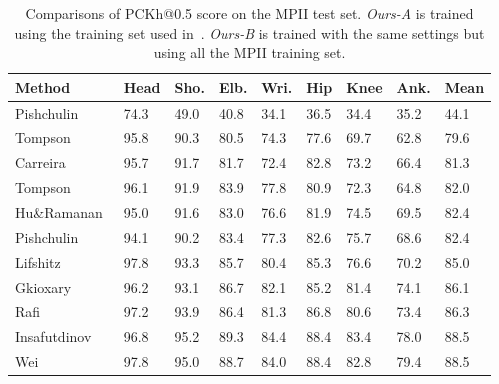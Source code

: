 \documentclass[10pt,twocolumn,letterpaper]{article}
\begin{document}
\begin{table}
	\begin{footnotesize}
		\centering
		\caption{ Comparisons of PCKh@0.5 score on the MPII test set. 
			\textit{Ours-A} is trained using the training set used in~\cite{tompson2015efficient}. 
			\textit{Ours-B} is trained with the same settings but using all the MPII training set.  
			}
		\begin{tabular} 
			{@{}p{2.6cm}p{0.3cm}p{0.3cm}p{0.3cm}p{0.3cm}p{0.3cm}p{0.3cm}p{0.3cm}p{0.5cm}}
			\hline
			Method & Head & Sho. & Elb. & Wri. & Hip & Knee & Ank. & Mean\\
			\hline
			Pishchulin \etal~\cite{pishchulin2013strong} & 74.3  & 49.0  & 40.8  & 34.1  & 36.5  & 34.4 & 35.2 & 44.1  \\
			Tompson \etal~\cite{tompson2014joint}& 95.8  & 90.3  & 80.5  & 74.3  & 77.6  & 69.7 & 62.8 & 79.6  \\
			Carreira \etal~\cite{carreira2016human} & 95.7  & 91.7  & 81.7  & 72.4  & 82.8  & 73.2 & 66.4 & 81.3  \\
			Tompson \etal~\cite{tompson2015efficient}& 96.1  & 91.9  & 83.9  & 77.8  & 80.9  & 72.3 & 64.8 & 82.0  \\
			Hu\&Ramanan~\cite{hu2016bottom} & 95.0  & 91.6  & 83.0  & 76.6  & 81.9  & 74.5 & 69.5 & 82.4  \\
			Pishchulin \etal~\cite{pishchulin2016deepcut} & 94.1  & 90.2  & 83.4  & 77.3  & 82.6  & 75.7 & 68.6 & 82.4   \\
			Lifshitz \etal~\cite{lifshitz2016human} & 97.8  & 93.3  & 85.7  & 80.4  & 85.3  & 76.6 & 70.2 & 85.0   \\
			Gkioxary \etal~\cite{gkioxari2016chained} & 96.2  & 93.1  & 86.7  & 82.1  & 85.2  & 81.4 & 74.1 & 86.1   \\
			Rafi \etal~\cite{rafi2016efficient} & 97.2  & 93.9  & 86.4  & 81.3  & 86.8  & 80.6 & 73.4 & 86.3   \\
			Insafutdinov \etal~\cite{insafutdinov2016deepercut} & 96.8  & 95.2  & 89.3  & 84.4  & 88.4  & 83.4 & 78.0 & 88.5   \\
			Wei \etal~\cite{wei2016convolutional} & 97.8  & 95.0  & 88.7  & 84.0  & 88.4  & 82.8 & 79.4 & 88.5   \\

\end{tabular}
\end{footnotesize}
\end{table}
\end{document}
